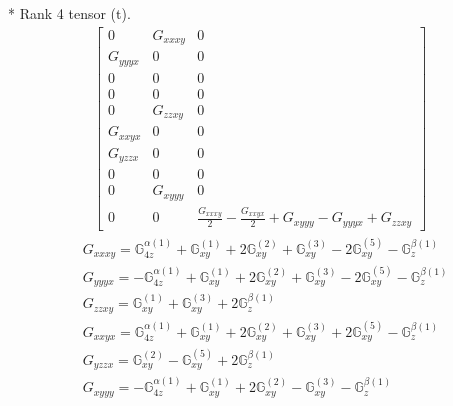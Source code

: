\documentclass[fleqn,8pt,landscape]{jsarticle}
\begin{document}
* Rank 4 tensor (t).
\begin{align*}
\begin{bmatrix} 0 & G_{xxxy} & 0 \\ G_{yyyx} & 0 & 0 \\ 0 & 0 & 0 \\ 0 & 0 & 0 \\ 0 & G_{zzxy} & 0 \\ G_{xxyx} & 0 & 0 \\ G_{yzzx} & 0 & 0 \\ 0 & 0 & 0 \\ 0 & G_{xyyy} & 0 \\ 0 & 0 & \frac{G_{xxxy}}{2} - \frac{G_{xxyx}}{2} + G_{xyyy} - G_{yyyx} + G_{zzxy} \end{bmatrix}
\end{align*}
\begin{align*}
& G_{xxxy} = \mathbb{G}_{4z}^{\alpha(1)} + \mathbb{G}_{xy}^{(1)} + 2 \mathbb{G}_{xy}^{(2)} + \mathbb{G}_{xy}^{(3)} - 2 \mathbb{G}_{xy}^{(5)} - \mathbb{G}_{z}^{\beta(1)} \\
& G_{yyyx} = - \mathbb{G}_{4z}^{\alpha(1)} + \mathbb{G}_{xy}^{(1)} + 2 \mathbb{G}_{xy}^{(2)} + \mathbb{G}_{xy}^{(3)} - 2 \mathbb{G}_{xy}^{(5)} - \mathbb{G}_{z}^{\beta(1)} \\
& G_{zzxy} = \mathbb{G}_{xy}^{(1)} + \mathbb{G}_{xy}^{(3)} + 2 \mathbb{G}_{z}^{\beta(1)} \\
& G_{xxyx} = \mathbb{G}_{4z}^{\alpha(1)} + \mathbb{G}_{xy}^{(1)} + 2 \mathbb{G}_{xy}^{(2)} + \mathbb{G}_{xy}^{(3)} + 2 \mathbb{G}_{xy}^{(5)} - \mathbb{G}_{z}^{\beta(1)} \\
& G_{yzzx} = \mathbb{G}_{xy}^{(2)} - \mathbb{G}_{xy}^{(5)} + 2 \mathbb{G}_{z}^{\beta(1)} \\
& G_{xyyy} = - \mathbb{G}_{4z}^{\alpha(1)} + \mathbb{G}_{xy}^{(1)} + 2 \mathbb{G}_{xy}^{(2)} - \mathbb{G}_{xy}^{(3)} - \mathbb{G}_{z}^{\beta(1)}
\end{align*}
\end{document}
